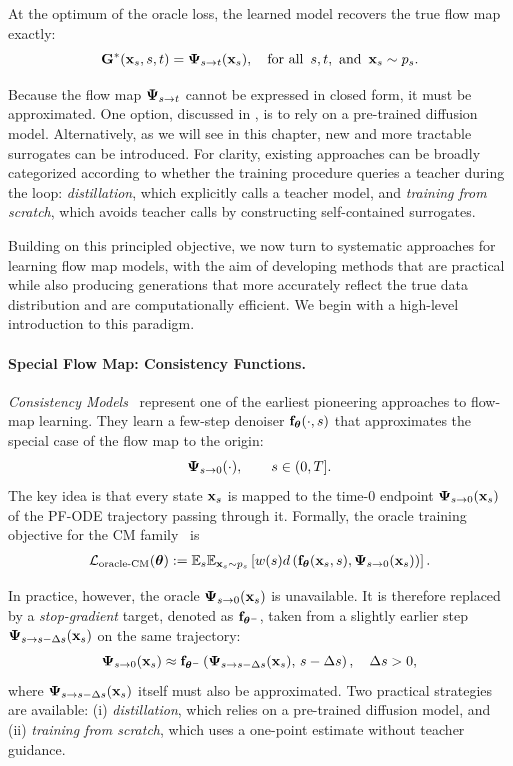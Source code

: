 At the optimum of the oracle loss, the learned model recovers the true flow map
exactly:
\[
{\mathbf{G}}^*({\mathbf{x}}_s, s, t) = {\bm{\Psi}}_{s\to t}({\mathbf{x}}_s), \quad \text{for all }\, s,t, \text{ and }\, {\mathbf{x}}_s \sim p_s.
\]


Because the flow map ${\bm{\Psi}}_{s\to t}$ cannot be expressed in closed form, it must be approximated. 
One option, discussed in , is to rely on a pre-trained diffusion model. 
Alternatively, as we will see in this chapter, new and more tractable surrogates can be introduced. 
For clarity, existing approaches can be broadly categorized according to whether the training procedure queries a teacher during the loop: 
\emph{distillation}, which explicitly calls a teacher model, and 
\emph{training from scratch}, which avoids teacher calls by constructing self-contained surrogates.



Building on this principled
objective, we now turn to systematic approaches for learning flow map models,
with the aim of developing methods that are practical while also producing
generations that more accurately reflect the true data distribution and are
computationally efficient. We begin with a high-level introduction to this paradigm.
\paragraph{Special Flow Map: Consistency Functions.}
\emph{Consistency Models}~\citep{song2023consistency} represent one of the earliest pioneering approaches to flow-map learning. 
They learn a few-step denoiser ${\mathbf{f}}_{\bm{\theta}}(\cdot,s)$ that approximates the special case of the flow map to the origin:
\[
{\bm{\Psi}}_{s\to 0}(\cdot), \qquad s \in (0,T].
\]
The key idea is that every state ${\mathbf{x}}_s$ is mapped to the time-$0$ endpoint
${\bm{\Psi}}_{s\to 0}({\mathbf{x}}_s)$ of the PF-ODE trajectory passing through it. Formally, the oracle training objective for the CM family~\citep{song2023consistency,songimproved,geng2024consistency,lu2024simplifying} is
\begin{align}\label{eq:oracle-cm}
    \mathcal{L}_{\mathrm{oracle}\text{-}\mathrm{CM}}({\bm{\theta}}) 
    := \mathbb{E}_{s} \mathbb{E}_{{\mathbf{x}}_s\sim p_s} \left[ w(s)  d \left({\mathbf{f}}_{\bm{\theta}}({\mathbf{x}}_s,s), {\bm{\Psi}}_{s\to 0}({\mathbf{x}}_s)\right)\right].
\end{align}




In practice, however, the oracle ${\bm{\Psi}}_{s\to 0}({\mathbf{x}}_s)$ is unavailable. It is therefore replaced by a \emph{stop-gradient} target, denoted as ${\mathbf{f}}_{{\bm{\theta}}^-}$, taken from a slightly earlier step ${\bm{\Psi}}_{s\to s-\Delta s}({\mathbf{x}}_s)$ on the same trajectory:
\[
{\bm{\Psi}}_{s\to 0}({\mathbf{x}}_s) \approx {\mathbf{f}}_{{\bm{\theta}}^-} \left({\bm{\Psi}}_{s\to s-\Delta s}({\mathbf{x}}_s),\,s-\Delta s\right), \quad \Delta s > 0,
\]
where ${\bm{\Psi}}_{s\to s-\Delta s}({\mathbf{x}}_s)$ itself must also be approximated. Two
practical strategies are available: (i) \emph{distillation}, which relies on a
pre-trained diffusion model, and (ii) \emph{training from scratch}, which uses a
one-point estimate without teacher guidance.

